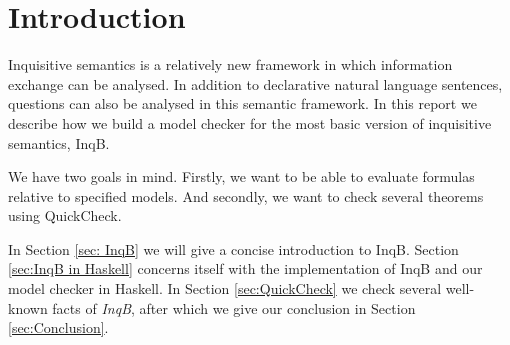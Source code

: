 \section{Introduction}\label{sec: Introduction}
Inquisitive semantics is a relatively new framework in which information exchange can be analysed. In addition to declarative natural language sentences, questions can also be analysed in this semantic framework. In this report we describe how we build a model checker for the most basic version of inquisitive semantics, \textsf{InqB}.

We have two goals in mind. Firstly, we want to be able to evaluate formulas relative to specified models. And secondly, we want to check several theorems using QuickCheck.

In Section \ref{sec: InqB} we will give a concise introduction to \textsf{InqB}. Section \ref{sec:InqB in Haskell} concerns itself with the implementation of \textsf{InqB} and our model checker in Haskell. In Section \ref{sec:QuickCheck} we check several well-known facts of \textit{InqB}, after which we give our conclusion in Section \ref{sec:Conclusion}.


